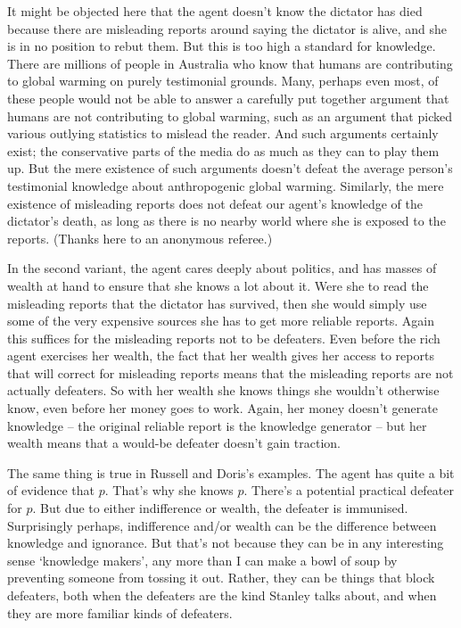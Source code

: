 It might be objected here that the agent doesn't know the dictator has died because there are misleading reports around saying the dictator is alive, and she is in no position to rebut them. But this is too high a standard for knowledge. There are millions of people in Australia who know that humans are contributing to global warming on purely testimonial grounds. Many, perhaps even most, of these people would not be able to answer a carefully put together argument that humans are not contributing to global warming, such as an argument that picked various outlying statistics to mislead the reader. And such arguments certainly exist; the conservative parts of the media do as much as they can to play them up. But the mere existence of such arguments doesn't defeat the average person's testimonial knowledge about anthropogenic global warming. Similarly, the mere existence of misleading reports does not defeat our agent's knowledge of the dictator's death, as long as there is no nearby world where she is exposed to the reports. (Thanks here to an anonymous referee.)

In the second variant, the agent cares deeply about politics, and has masses of wealth at hand to ensure that she knows a lot about it. Were she to read the misleading reports that the dictator has survived, then she would simply use some of the very expensive sources she has to get more reliable reports. Again this suffices for the misleading reports not to be defeaters. Even before the rich agent exercises her wealth, the fact that her wealth gives her access to reports that will correct for misleading reports means that the misleading reports are not actually defeaters. So with her wealth she knows things she wouldn't otherwise know, even before her money goes to work. Again, her money doesn't generate knowledge -- the original reliable report is the knowledge generator -- but her wealth means that a would-be defeater doesn't gain traction.

The same thing is true in Russell and Doris's examples. The agent has quite a bit of evidence that $p$. That's why she knows $p$. There's a potential practical defeater for $p$. But due to either indifference or wealth, the defeater is immunised. Surprisingly perhaps, indifference and/or wealth can be the difference between knowledge and ignorance. But that's not because they can be in any interesting sense `knowledge makers', any more than I can make a bowl of soup by preventing someone from tossing it out. Rather, they can be things that block defeaters, both when the defeaters are the kind Stanley talks about, and when they are more familiar kinds of defeaters.


